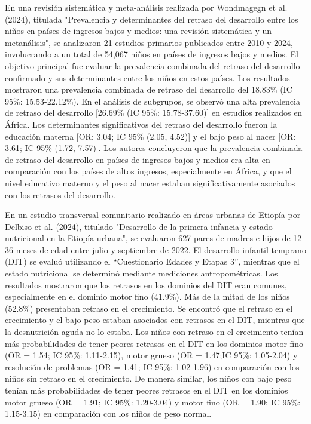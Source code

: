 \documentclass[11pt,letterpaper]{report}
\newcommand{\asq}{“Cuestionario Edades y Etapas 3”}
\begin{document}
En una revisión sistemática y meta-análisis realizada por Wondmagegn et al.
(2024), titulada "Prevalencia y determinantes del retraso del desarrollo entre
los niños en países de ingresos bajos y medios: una revisión sistemática y un
metanálisis", se analizaron 21 estudios primarios publicados entre 2010 y
2024, involucrando a un total de 54,067 niños en países de ingresos bajos y
medios. El objetivo principal fue evaluar la prevalencia combinada del retraso
del desarrollo confirmado y sus determinantes entre los niños en estos países.
Los resultados mostraron una prevalencia combinada de retraso del desarrollo
del 18.83\% (IC 95\%: 15.53-22.12\%). En el análisis de subgrupos, se observó
una alta prevalencia de retraso del desarrollo [26.69\% (IC 95\%: 15.78-37.60)]
en estudios realizados en África. Los determinantes significativos del retraso
del desarrollo fueron la educación materna [OR: 3.04; IC 95\% (2.05, 4.52)] y
el bajo peso al nacer [OR: 3.61; IC 95\% (1.72, 7.57)]. Los autores concluyeron
que la prevalencia combinada de retraso del desarrollo en países de ingresos
bajos y medios era alta en comparación con los países de altos ingresos,
especialmente en África, y que el nivel educativo materno y el peso al nacer
estaban significativamente asociados con los retrasos del desarrollo.
\cite{Wondmagegn2024}

En un estudio transversal comunitario realizado en áreas urbanas de Etiopía por
Delbiso et al. (2024), titulado "Desarrollo de la primera infancia y estado
nutricional en la Etiopía urbana", se evaluaron 627 pares de madres e hijos de
12-36 meses de edad entre julio y septiembre de 2022. El desarrollo infantil
temprano (DIT) se evaluó utilizando el \asq, mientras que el estado nutricional
se determinó mediante mediciones antropométricas. Los resultados mostraron que
los retrasos en los dominios del DIT eran comunes, especialmente en el dominio
motor fino (41.9\%). Más de la mitad de los niños (52.8\%) presentaban retraso
en el crecimiento. Se encontró que el retraso en el crecimiento y el bajo peso
estaban asociados con retrasos en el DIT, mientras que la desnutrición aguda no
lo estaba. Los niños con retraso en el crecimiento tenían más probabilidades de
tener peores retrasos en el DIT en los dominios motor fino (OR = 1.54; IC 95\%:
1.11-2.15), motor grueso (OR = 1.47;IC 95\%: 1.05-2.04) y resolución de
problemas (OR = 1.41; IC 95\%: 1.02-1.96) en comparación con los niños sin
retraso en el crecimiento. De manera similar, los niños con bajo peso tenían
más probabilidades de tener peores retrasos en el DIT en los dominios motor
grueso (OR = 1.91; IC 95\%: 1.20-3.04) y motor fino (OR = 1.90; IC 95\%:
1.15-3.15) en comparación con los niños de peso normal. \cite{Delbiso2024}
\end{document}
